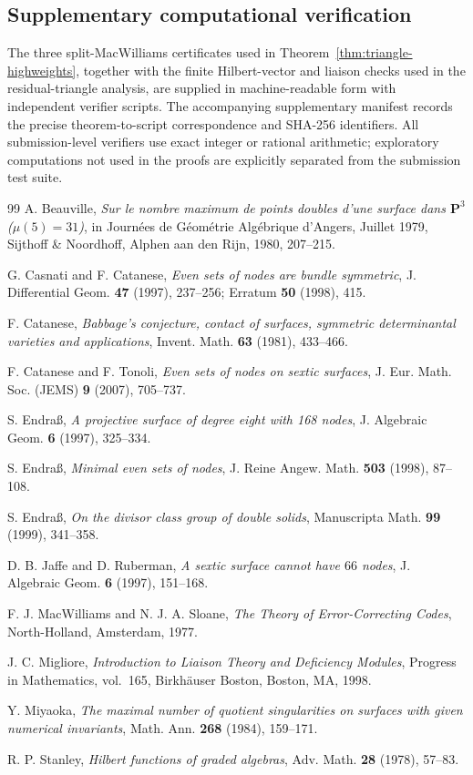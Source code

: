 \documentclass[11pt,reqno]{amsart}
\theoremstyle{remark}
\newcommand{\PP}{\mathbf P}
\begin{document}
\subsection{Supplementary computational verification}
The three split-MacWilliams certificates used in Theorem~\ref{thm:triangle-highweights}, together with the finite Hilbert-vector and liaison checks used in the residual-triangle analysis, are supplied in machine-readable form with independent verifier scripts.  The accompanying supplementary manifest records the precise theorem-to-script correspondence and SHA-256 identifiers.  All submission-level verifiers use exact integer or rational arithmetic; exploratory computations not used in the proofs are explicitly separated from the submission test suite.

\begin{thebibliography}{99}
A. Beauville,
\emph{Sur le nombre maximum de points doubles d'une surface dans $\PP^3$ ($\mu(5)=31$)},
in Journ\'ees de G\'eom\'etrie Alg\'ebrique d'Angers, Juillet 1979, Sijthoff \& Noordhoff, Alphen aan den Rijn, 1980, 207--215.

G. Casnati and F. Catanese,
\emph{Even sets of nodes are bundle symmetric},
J. Differential Geom. \textbf{47} (1997), 237--256; Erratum \textbf{50} (1998), 415.

F. Catanese,
\emph{Babbage's conjecture, contact of surfaces, symmetric determinantal varieties and applications},
Invent. Math. \textbf{63} (1981), 433--466.

F. Catanese and F. Tonoli,
\emph{Even sets of nodes on sextic surfaces},
J. Eur. Math. Soc. (JEMS) \textbf{9} (2007), 705--737.

S. Endra\ss,
\emph{A projective surface of degree eight with 168 nodes},
J. Algebraic Geom. \textbf{6} (1997), 325--334.

S. Endra\ss,
\emph{Minimal even sets of nodes},
J. Reine Angew. Math. \textbf{503} (1998), 87--108.

S. Endra\ss,
\emph{On the divisor class group of double solids},
Manuscripta Math. \textbf{99} (1999), 341--358.

D. B. Jaffe and D. Ruberman,
\emph{A sextic surface cannot have $66$ nodes},
J. Algebraic Geom. \textbf{6} (1997), 151--168.

F. J. MacWilliams and N. J. A. Sloane,
\emph{The Theory of Error-Correcting Codes},
North-Holland, Amsterdam, 1977.

J. C. Migliore,
\emph{Introduction to Liaison Theory and Deficiency Modules},
Progress in Mathematics, vol.~165, Birkh\"auser Boston, Boston, MA, 1998.

Y. Miyaoka,
\emph{The maximal number of quotient singularities on surfaces with given numerical invariants},
Math. Ann. \textbf{268} (1984), 159--171.

R. P. Stanley,
\emph{Hilbert functions of graded algebras},
Adv. Math. \textbf{28} (1978), 57--83.
\end{thebibliography}
\end{document}
